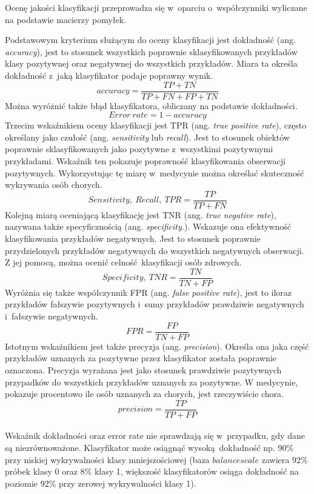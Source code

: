 Ocenę jakości klasyfikacji przeprowadza się w~oparciu o~współczynniki wyliczane na podstawie macierzy pomyłek.\par
Podstawowym kryterium służącym do oceny klasyfikacji jest dokładność (ang. \textit{accuracy}), jest to stosunek wszystkich poprawnie sklasyfikowanych przykładów klasy pozytywnej oraz negatywnej do wszystkich przykładów. Miara ta określa dokładność z~jaką klasyfikator podaje poprawny wynik.
\[accuracy = \frac{TP + TN}{TP + FN + FP + TN}\]
Można wyróżnić także błąd klasyfikatora, obliczany na podstawie dokładności.
\[Error\ rate = 1 - accuracy\label{error_rate}\]
Trzecim wskaźnikiem oceny klasyfikacji jest TPR (ang. \textit{true positive rate}), często określany jako czułość (ang. \textit{sensitivity} lub \textit{recall}). Jest to stosunek obiektów poprawnie sklasyfikowanych jako pozytywne z~wszystkimi pozytywnymi przykładami. Wskaźnik ten pokazuje poprawność klasyfikowania obserwacji pozytywnych. Wykorzystując tę miarę w~medycynie można określać skuteczność wykrywania osób chorych.
\[Sensitivity,\ Recall,\ TPR = \frac{TP}{TP + FN}\]
Kolejną miarą oceniającą klasyfikację jest TNR (ang. \textit{true negative rate}), nazywana także specyficznością (ang. \textit{specificity.}). Wskazuje ona efektywność klasyfikowania przykładów negatywnych. Jest to stosunek poprawnie przydzielonych przykładów negatywnych do wszystkich negatywnych obserwacji. Z jej pomocą, można ocenić celność klasyfikacji osób zdrowych.
\[Specificity,\ TNR = \frac{TN}{TN + FP}\]
Wyróżnia się także współczynnik FPR (ang. \textit{false positive rate}), jest to iloraz przykładów fałszywie pozytywnych i~sumy przykładów prawdziwie negatywnych i~fałszywie negatywnych.
\[FPR = \frac{FP}{TN + FP}\]
Istotnym wskaźnikiem jest także precyzja (ang. \textit{precision}). Określa ona jaka część przykładów uznanych za pozytywne przez klasyfikator została poprawnie oznaczona. Precyzja wyrażana jest jako stosunek prawdziwie pozytywnych przypadków do wszystkich przykładów uznanych za pozytywne. W medycynie, pokazuje procentowo ile osób uznanych za chorych, jest rzeczywiście chora.
\[precision = \frac{TP}{TP + FP}\]\\
Wskaźnik dokładności oraz error rate nie sprawdzają się w~przypadku, gdy dane są niezrównoważone. Klasyfikator może osiągnąć wysoką dokładność np. 90\% przy niskiej wykrywalności klasy mniejszościowej (baza $balance scale$ zawiera 92\% próbek klasy 0 oraz 8\% klasy 1, większość klasyfikatorów osiąga dokładność na poziomie 92\% przy zerowej wykrywalności klasy 1).

